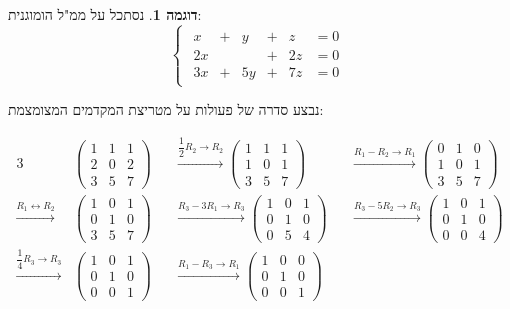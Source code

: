 \documentclass[12pt]{report}
\theoremstyle{plain}
\theoremstyle{definition}
\newtheorem{example}{דוגמה}[chapter]
\newcommand{\0}{\mathbf{0}}
\begin{document}
\begin{example}\label{ex:gauss}
נסתכל על ממ"ל הומוגנית:
$$
\begin{cases}
\begin{alignedat}{5}
x &{}+{}& y &{}+{}& z &= 0 \\[4pt]
2x &{}{}&    &{}+{}& 2z &= 0 \\[4pt]
3x &{}+{}& 5y &{}+{}& 7z &= 0
\end{alignedat}
\end{cases}
$$

נבצע סדרה של פעולות על מטריצת המקדמים המצומצמת:

	\begin{alignat*}{3}
		&\begin{pmatrix} 1 & 1 & 1 \\ 2 & 0 & 2 \\ 3 & 5 & 7 \end{pmatrix}
		&&\xrightarrow{\dfrac{1}{2}R_2 \to R_2}
		\begin{pmatrix} 1 & 1 & 1 \\ 1 & 0 & 1 \\ 3 & 5 & 7 \end{pmatrix}
		&&\xrightarrow{R_1 - R_2 \to R_1}
		\begin{pmatrix} 0 & 1 & 0 \\ 1 & 0 & 1 \\ 3 & 5 & 7 \end{pmatrix} \\
		\xrightarrow{R_1 \leftrightarrow R_2}&\begin{pmatrix} 1 & 0 & 1 \\ 0 & 1 & 0 \\ 3 & 5 & 7 \end{pmatrix}
		&&\xrightarrow{R_3 - 3R_1 \to R_3}
		\begin{pmatrix} 1 & 0 & 1 \\ 0 & 1 & 0 \\ 0 & 5 & 4 \end{pmatrix}
		&&\xrightarrow{R_3 - 5R_2 \to R_3}
		\begin{pmatrix} 1 & 0 & 1 \\ 0 & 1 & 0 \\ 0 & 0 & 4 \end{pmatrix} \\
		\xrightarrow{\dfrac{1}{4}R_3 \to R_3}&\begin{pmatrix} 1 & 0 & 1 \\ 0 & 1 & 0 \\ 0 & 0 & 1 \end{pmatrix}
		&&\xrightarrow{R_1 - R_3 \to R_1}
		\begin{pmatrix} 1 & 0 & 0 \\ 0 & 1 & 0 \\ 0 & 0 & 1 \end{pmatrix}
		&&
	\end{alignat*}


\end{example}
\end{document}
